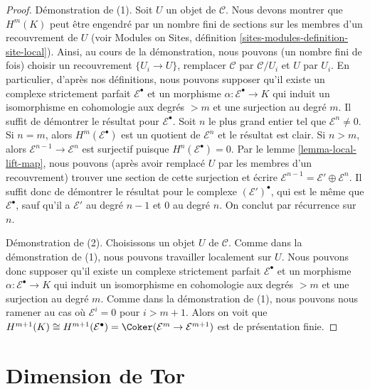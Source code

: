 \begin{proof}
Démonstration de (1). Soit $U$ un objet de $\mathcal{C}$. Nous devons montrer
que $H^m(K)$ peut être engendré par un nombre fini de sections sur les membres
d'un recouvrement de $U$ (voir Modules on Sites, définition
\ref{sites-modules-definition-site-local}). Ainsi, au cours de la
démonstration, nous pouvons (un nombre fini de fois) choisir un recouvrement
$\{U_i \to U\}$, remplacer $\mathcal{C}$ par $\mathcal{C}/U_i$ et $U$ par
$U_i$. En particulier, d'après nos définitions, nous pouvons supposer qu'il
existe un complexe strictement parfait $\mathcal{E}^\bullet$ et un morphisme
$\alpha : \mathcal{E}^\bullet \to K$ qui induit un isomorphisme en cohomologie
aux degrés $> m$ et une surjection au degré $m$. Il suffit de démontrer le
résultat pour $\mathcal{E}^\bullet$. Soit $n$ le plus grand entier tel que
$\mathcal{E}^n \not = 0$. Si $n = m$, alors
$H^m(\mathcal{E}^\bullet)$ est un quotient de $\mathcal{E}^n$ et le résultat
est clair. Si $n > m$, alors $\mathcal{E}^{n - 1} \to \mathcal{E}^n$ est
surjectif puisque $H^n(\mathcal{E}^\bullet) = 0$. Par le lemme
\ref{lemma-local-lift-map}, nous pouvons (après avoir remplacé $U$ par les
membres d'un recouvrement) trouver une section de cette surjection et écrire
$\mathcal{E}^{n - 1} = \mathcal{E}' \oplus \mathcal{E}^n$. Il suffit donc de
démontrer le résultat pour le complexe $(\mathcal{E}')^\bullet$, qui est le
même que $\mathcal{E}^\bullet$, sauf qu'il a $\mathcal{E}'$ au degré $n - 1$
et $0$ au degré $n$. On conclut par récurrence sur $n$.

\medskip\noindent
Démonstration de (2). Choisissons un objet $U$ de $\mathcal{C}$. Comme dans
la démonstration de (1), nous pouvons travailler localement sur $U$. Nous
pouvons donc supposer qu'il existe un complexe strictement parfait
$\mathcal{E}^\bullet$ et un morphisme
$\alpha : \mathcal{E}^\bullet \to K$ qui induit un isomorphisme en cohomologie
aux degrés $> m$ et une surjection au degré $m$. Comme dans la démonstration
de (1), nous pouvons nous ramener au cas où $\mathcal{E}^i = 0$ pour
$i > m + 1$. Alors on voit que
$H^{m + 1}(K) \cong H^{m + 1}(\mathcal{E}^\bullet) =
\Coker(\mathcal{E}^m \to \mathcal{E}^{m + 1})$
est de présentation finie.
\end{proof}








\section{Dimension de Tor}
\label{section-tor}


